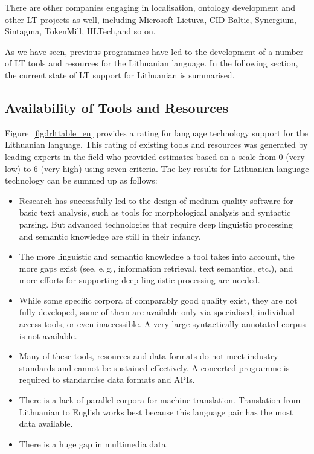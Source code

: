 \begin{multicols}{2}
There are other companies engaging in localisation, ontology development and other LT projects as well, including Microsoft Lietuva, CID Baltic, Synergium, Sintagma, TokenMill, HLTech,and so on. 

    As we have seen, previous programmes have led to the development of a number of LT tools and resources for the Lithuanian language. In the following section, the current state of LT support for Lithuanian is summarised.
  
\subsection{Availability of Tools and Resources}

Figure~\ref{fig:lrlttable_en} provides a rating for language technology support for the Lithuanian language. This rating of existing tools and resources was generated by leading experts in the field who provided estimates based on a scale from 0 (very low) to 6 (very high) using seven criteria.
%
The key results for Lithuanian language technology can be summed up as follows:

\begin{itemize}
\item Research has successfully led to the design of medium-quality software for basic text analysis, such as tools for morphological analysis and syntactic parsing. But advanced technologies that require deep linguistic processing and semantic knowledge are still in their infancy. 
\item The more linguistic and semantic knowledge a tool takes into account, the more gaps exist (see, e.\,g., information retrieval, text semantics, etc.), and more efforts for supporting deep linguistic processing are needed. 
\item While some specific corpora of comparably good quality exist, they are not fully developed, some of them are available only via specialised, individual access tools, or even inaccessible. A very large syntactically annotated corpus is not available. 
\item Many of these tools, resources and data formats do not meet industry standards and cannot be sustained effectively. A concerted programme is required to standardise data formats and APIs. 
\item There is a lack of parallel corpora for machine translation. Translation from Lithuanian to English works best because this language pair has the most data available.
\item There is a huge gap in multimedia data.
\end{itemize}


\end{multicols}
